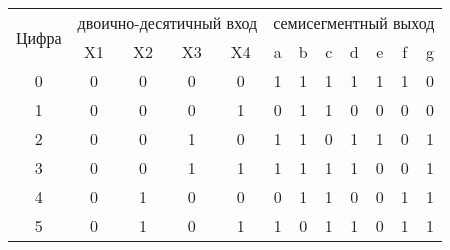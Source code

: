 \begin{table}[]
\centering
\begin{tabular}{|c|cccc|ccccccc|}
\hline
\multirow{2}{*}{Цифра} & \multicolumn{4}{c|}{двоично-десятичный вход}                                     & \multicolumn{7}{c|}{семисегментный выход}                                                                                                               \\ \cline{2-12} 
                       & \multicolumn{1}{c|}{X1} & \multicolumn{1}{c|}{X2} & \multicolumn{1}{c|}{X3} & X4 & \multicolumn{1}{c|}{a} & \multicolumn{1}{c|}{b} & \multicolumn{1}{c|}{c} & \multicolumn{1}{c|}{d} & \multicolumn{1}{c|}{e} & \multicolumn{1}{c|}{f} & g \\ \hline
0                      & \multicolumn{1}{c|}{0}  & \multicolumn{1}{c|}{0}  & \multicolumn{1}{c|}{0}  & 0  & \multicolumn{1}{c|}{1} & \multicolumn{1}{c|}{1} & \multicolumn{1}{c|}{1} & \multicolumn{1}{c|}{1} & \multicolumn{1}{c|}{1} & \multicolumn{1}{c|}{1} & 0 \\ \hline
1                      & \multicolumn{1}{c|}{0}  & \multicolumn{1}{c|}{0}  & \multicolumn{1}{c|}{0}  & 1  & \multicolumn{1}{c|}{0} & \multicolumn{1}{c|}{1} & \multicolumn{1}{c|}{1} & \multicolumn{1}{c|}{0} & \multicolumn{1}{c|}{0} & \multicolumn{1}{c|}{0} & 0 \\ \hline
2                      & \multicolumn{1}{c|}{0}  & \multicolumn{1}{c|}{0}  & \multicolumn{1}{c|}{1}  & 0  & \multicolumn{1}{c|}{1} & \multicolumn{1}{c|}{1} & \multicolumn{1}{c|}{0} & \multicolumn{1}{c|}{1} & \multicolumn{1}{c|}{1} & \multicolumn{1}{c|}{0} & 1 \\ \hline
3                      & \multicolumn{1}{c|}{0}  & \multicolumn{1}{c|}{0}  & \multicolumn{1}{c|}{1}  & 1  & \multicolumn{1}{c|}{1} & \multicolumn{1}{c|}{1} & \multicolumn{1}{c|}{1} & \multicolumn{1}{c|}{1} & \multicolumn{1}{c|}{0} & \multicolumn{1}{c|}{0} & 1 \\ \hline
4                      & \multicolumn{1}{c|}{0}  & \multicolumn{1}{c|}{1}  & \multicolumn{1}{c|}{0}  & 0  & \multicolumn{1}{c|}{0} & \multicolumn{1}{c|}{1} & \multicolumn{1}{c|}{1} & \multicolumn{1}{c|}{0} & \multicolumn{1}{c|}{0} & \multicolumn{1}{c|}{1} & 1 \\ \hline
5                      & \multicolumn{1}{c|}{0}  & \multicolumn{1}{c|}{1}  & \multicolumn{1}{c|}{0}  & 1  & \multicolumn{1}{c|}{1} & \multicolumn{1}{c|}{0} & \multicolumn{1}{c|}{1} & \multicolumn{1}{c|}{1} & \multicolumn{1}{c|}{0} & \multicolumn{1}{c|}{1} & 1 \\ \hline

\end{tabular}
\end{table}
